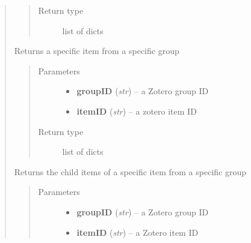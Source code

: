\documentclass[letterpaper,10pt,english]{sphinxmanual}
\begin{document}
\begin{quote}
\begin{fulllineitems}
\begin{quote}
\begin{description}
\item[{Return type}] \leavevmode
list of dicts

\end{description}\end{quote}

\end{fulllineitems}


\begin{fulllineitems}
\label{index:pyzotero.zotero.Zotero.group_item}
Returns a specific item from a specific group
\begin{quote}\begin{description}
\item[{Parameters}] \leavevmode\begin{itemize}
\item {} 
\textbf{groupID} (\emph{str}) -- a Zotero group ID

\item {} 
\textbf{itemID} (\emph{str}) -- a zotero item ID

\end{itemize}

\item[{Return type}] \leavevmode
list of dicts

\end{description}\end{quote}

\end{fulllineitems}


\begin{fulllineitems}
\label{index:pyzotero.zotero.Zotero.group_item_children}
Returns the child items of a specific item from a specific group
\begin{quote}\begin{description}
\item[{Parameters}] \leavevmode\begin{itemize}
\item {} 
\textbf{groupID} (\emph{str}) -- a Zotero group ID

\item {} 
\textbf{itemID} (\emph{str}) -- a Zotero item ID


\end{itemize}
\end{description}
\end{quote}
\end{fulllineitems}
\end{quote}
\end{document}
